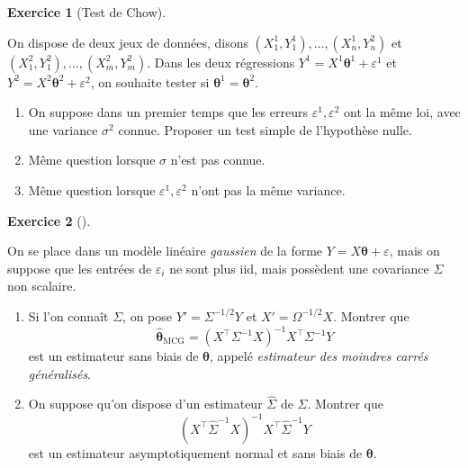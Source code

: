 \documentclass[
  10,
  letterpaper,
  DIV=11,
  numbers=noendperiod]{scrreport}
\providecommand{\tightlist}{%
  \setlength{\itemsep}{0pt}\setlength{\parskip}{0pt}}\usepackage{longtable,booktabs,array}
\newcommand{\bt}{\boldsymbol{\theta}}
\theoremstyle{plain}
\theoremstyle{definition}
\newtheorem{exercise}{Exercice}[chapter]
\theoremstyle{plain}
\theoremstyle{definition}
\theoremstyle{definition}
\theoremstyle{plain}
\theoremstyle{remark}
\begin{document}
\begin{exercise}[Test de
Chow]\protect\hypertarget{exr-chow}{}\label{exr-chow}

On dispose de deux jeux de données, disons
\((X^1_1, Y^1_1), \dotsc, (X^1_n, Y^2_n)\) et
\((X^2_{1}, Y^2_{1}), \dotsc, (X^2_m, Y^2_m)\). Dans les deux
régressions \(Y^1 = X^1 \bt^1+ \varepsilon^1\) et
\(Y^2 = X^2\bt^2+\varepsilon^2\), on souhaite tester si
\(\bt^1 = \bt^2\).

\begin{enumerate}
\def\labelenumi{\arabic{enumi}.}
\tightlist
\item
  On suppose dans un premier temps que les erreurs
  \(\varepsilon^1, \varepsilon^2\) ont la même loi, avec une variance
  \(\sigma^2\) connue. Proposer un test simple de l'hypothèse nulle.
\item
  Même question lorsque \(\sigma\) n'est pas connue.
\item
  Même question lorsque \(\varepsilon^1,\varepsilon^2\) n'ont pas la
  même variance.
\end{enumerate}

\end{exercise}

\begin{exercise}[]\protect\hypertarget{exr-covnonscal}{}\label{exr-covnonscal}

On se place dans un modèle linéaire \emph{gaussien} de la forme
\(Y = X\bt + \varepsilon\), mais on suppose que les entrées de
\(\varepsilon_i\) ne sont plus iid, mais possèdent une covariance
\(\Sigma\) non scalaire.

\begin{enumerate}
\def\labelenumi{\arabic{enumi}.}
\tightlist
\item
  Si l'on connaît \(\Sigma\), on pose \(Y' = \Sigma^{-1/2}Y\) et
  \(X' = \Omega^{-1/2}X\). Montrer que
  \[\hat{\bt}_{\mathrm{MCG}}= (X^\top \Sigma^{-1} X)^{-1}X^\top \Sigma^{-1}Y\]
  est un estimateur sans biais de \(\bt\), appelé \emph{estimateur des
  moindres carrés généralisés}.
\item
  On suppose qu'on dispose d'un estimateur \(\hat{\Sigma}\) de
  \(\Sigma\). Montrer que
  \[(X^\top \hat{\Sigma}^{-1} X)^{-1}X^\top \hat{\Sigma}^{-1}Y\] est un
  estimateur asymptotiquement normal et sans biais de \(\bt\).
\end{enumerate}

\end{exercise}
\end{document}
